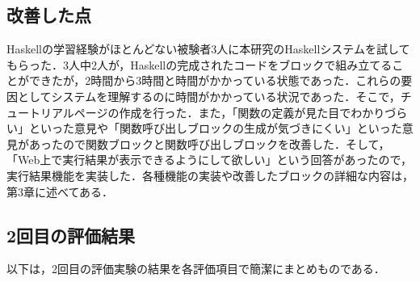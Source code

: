 \documentclass{risepaper}
\begin{document}
   		\subsection{改善した点}
        
Haskellの学習経験がほとんどない被験者3人に本研究のHaskellシステムを試してもらった．3人中2人が，Haskellの完成されたコードをブロックで組み立てることができたが，2時間から3時間と時間がかかっている状態であった．これらの要因としてシステムを理解するのに時間がかかっている状況であった．そこで，チュートリアルページの作成を行った．また，「関数の定義が見た目でわかりづらい」といった意見や「関数呼び出しブロックの生成が気づきにくい」といった意見があったので関数ブロックと関数呼び出しブロックを改善した．そして，「Web上で実行結果が表示できるようにして欲しい」という回答があったので，実行結果機能を実装した．各種機能の実装や改善したブロックの詳細な内容は，第3章に述べてある．

		\subsection{2回目の評価結果}

以下は，2回目の評価実験の結果を各評価項目で簡潔にまとめものである．
\end{document}
